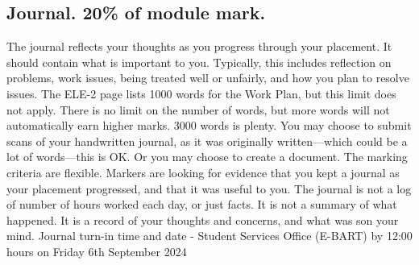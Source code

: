 \documentclass[11pt]{article}
\begin{document}
\subsection{Journal. 20\% of module mark.}
\label{sec:org22bdc03}
The journal reflects your thoughts as you progress through your placement. It should
contain what is important to you. Typically, this includes reflection on problems, work
issues, being treated well or unfairly, and how you plan to resolve issues. The ELE-2 page
lists 1000 words for the Work Plan, but this limit does not apply.
There is no limit on the number of words, but more words will not automatically earn higher
marks. 3000 words is plenty. You may choose to submit scans of your handwritten journal,
as it was originally written—which could be a lot of words—this is OK. Or you may choose to
create a document. The marking criteria are flexible. Markers are looking for evidence that
you kept a journal as your placement progressed, and that it was useful to you. The journal
is not a log of number of hours worked each day, or just facts. It is not a summary of what
happened. It is a record of your thoughts and concerns, and what was son your mind.
Journal turn-in time and date - Student Services Office (E-BART) by 12:00 hours on Friday
6th September 2024
\end{document}
